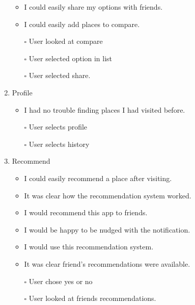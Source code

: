 \documentclass[a4 paper, 10pt]{article}
\begin{document}
\begin{multicols}{2}
\begin{enumerate}
\begin{itemize}
                    \item I could easily share my options with friends.
                    \item I could easily add places to compare.                    
                    \item[$\square$] User looked at compare
                    \item[$\square$] User selected option in list
                    \item[$\square$] User selected share.
                \end{itemize}
            \item Profile
                \begin{itemize}
                    \item I had no trouble finding places I had visited before.                    
                    \item[$\square$] User selects profile
                    \item[$\square$] User selects history
                \end{itemize}
            \item Recommend
                \begin{itemize}
                    \item I could easily recommend a place after visiting.
                    \item It was clear how the recommendation system worked.
                    \item I would recommend this app to friends.
                    \item I would be happy to be nudged with the notification.
                    \item I would use this recommendation system.
                    \item It was clear friend’s recommendations were available.                    
                    \item[$\square$] User chose yes or no
                    \item[$\square$] User looked at friends recommendations.
                \end{itemize}


\end{enumerate}
\end{multicols}
\end{document}
